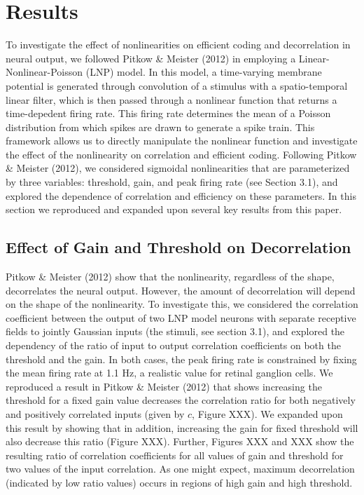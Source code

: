 \documentclass[12pt]{article}
\begin{document}
\section{Results}

To investigate the effect of nonlinearities on efficient coding and decorrelation in neural output, we followed Pitkow \& Meister (2012) in employing a Linear-Nonlinear-Poisson (LNP) model. In this model, a time-varying membrane potential is generated through convolution of a stimulus with a spatio-temporal linear filter, which is then passed through a nonlinear function that returns a time-depedent firing rate. This firing rate determines the mean of a Poisson distribution from which spikes are drawn to generate a spike train. This framework allows us to directly manipulate the nonlinear function and investigate the effect of the nonlinearity on correlation and efficient coding. Following Pitkow \& Meister (2012), we considered sigmoidal nonlinearities that are parameterized by three variables: threshold, gain, and peak firing rate (see Section 3.1), and explored the dependence of correlation and efficiency on these parameters. In this section we reproduced and expanded upon several key results from this paper.

\subsection{Effect of Gain and Threshold on Decorrelation}

Pitkow \& Meister (2012) show that the nonlinearity, regardless of the shape, decorrelates the neural output. However, the amount of decorrelation will depend on the shape of the nonlinearity. To investigate this, we considered the correlation coefficient between the output of two LNP model neurons with separate receptive fields to jointly Gaussian inputs (the stimuli, see section 3.1), and explored the dependency of the ratio of input to output correlation coefficients on both the threshold and the gain. In both cases, the peak firing rate is constrained by fixing the mean firing rate at 1.1 Hz, a realistic value for retinal ganglion cells. We reproduced a result in Pitkow \& Meister (2012) that shows increasing the threshold for a fixed gain value decreases the correlation ratio for both negatively and positively correlated inputs (given by $c$, Figure XXX). We expanded upon this result by showing that in addition, increasing the gain for fixed threshold will also decrease this ratio (Figure XXX). Further, Figures XXX and XXX show the resulting ratio of correlation coefficients for all values of gain and threshold for two values of the input correlation. As one might expect, maximum decorrelation (indicated by low ratio values) occurs in regions of high gain and high threshold.
\end{document}
